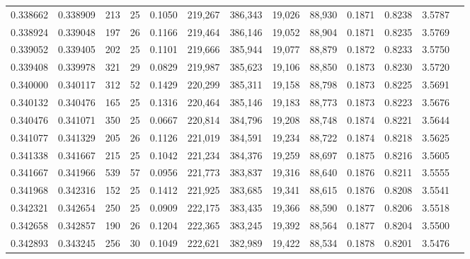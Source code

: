\begin{tabular}{rrrrrrrrrrrrr}
0.338662 & 0.338909 &    213 &    25 &                                     0.1050 & 219,267 & 386,343 &  19,026 &  88,930 & 0.1871 & 0.8238 & 3.5787 \\
0.338924 & 0.339048 &    197 &    26 &                                     0.1166 & 219,464 & 386,146 &  19,052 &  88,904 & 0.1871 & 0.8235 & 3.5769 \\
0.339052 & 0.339405 &    202 &    25 &                                     0.1101 & 219,666 & 385,944 &  19,077 &  88,879 & 0.1872 & 0.8233 & 3.5750 \\
0.339408 & 0.339978 &    321 &    29 &                                     0.0829 & 219,987 & 385,623 &  19,106 &  88,850 & 0.1873 & 0.8230 & 3.5720 \\
0.340000 & 0.340117 &    312 &    52 &                                     0.1429 & 220,299 & 385,311 &  19,158 &  88,798 & 0.1873 & 0.8225 & 3.5691 \\
0.340132 & 0.340476 &    165 &    25 &                                     0.1316 & 220,464 & 385,146 &  19,183 &  88,773 & 0.1873 & 0.8223 & 3.5676 \\
0.340476 & 0.341071 &    350 &    25 &                                     0.0667 & 220,814 & 384,796 &  19,208 &  88,748 & 0.1874 & 0.8221 & 3.5644 \\
0.341077 & 0.341329 &    205 &    26 &                                     0.1126 & 221,019 & 384,591 &  19,234 &  88,722 & 0.1874 & 0.8218 & 3.5625 \\
0.341338 & 0.341667 &    215 &    25 &                                     0.1042 & 221,234 & 384,376 &  19,259 &  88,697 & 0.1875 & 0.8216 & 3.5605 \\
0.341667 & 0.341966 &    539 &    57 &                                     0.0956 & 221,773 & 383,837 &  19,316 &  88,640 & 0.1876 & 0.8211 & 3.5555 \\
0.341968 & 0.342316 &    152 &    25 &                                     0.1412 & 221,925 & 383,685 &  19,341 &  88,615 & 0.1876 & 0.8208 & 3.5541 \\
0.342321 & 0.342654 &    250 &    25 &                                     0.0909 & 222,175 & 383,435 &  19,366 &  88,590 & 0.1877 & 0.8206 & 3.5518 \\
0.342658 & 0.342857 &    190 &    26 &                                     0.1204 & 222,365 & 383,245 &  19,392 &  88,564 & 0.1877 & 0.8204 & 3.5500 \\
0.342893 & 0.343245 &    256 &    30 &                                     0.1049 & 222,621 & 382,989 &  19,422 &  88,534 & 0.1878 & 0.8201 & 3.5476 \\

\end{tabular}
